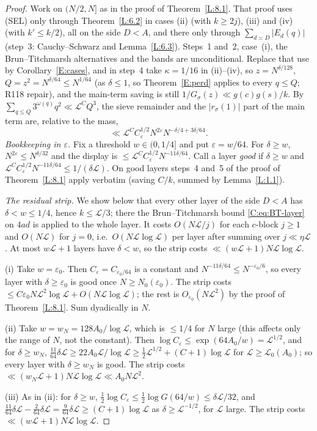 \documentclass[10pt,reqno]{amsart}
\theoremstyle{definition}
\numberwithin{equation}{section}
\newcommand{\cL}{\mathcal L}
\begin{document}
\begin{proof}
Work on $(N/2,N]$ as in the proof of Theorem~\ref{L:8.1}. That proof
uses (SEL) only through Theorem~\ref{L:6.2} in cases (ii) (with $k\ge2j$),
(iii) and (iv) (with $k'\le k/2$), all on the side $D<A$, and there only
through $\sum_{d\asymp D}|E_d(q)|$ (step~3: Cauchy--Schwarz and
Lemma~\ref{L:6.3}). Steps~1 and~2, case~(i), the Brun--Titchmarsh
alternatives and the bands are unconditional. Replace that use by
Corollary~\ref{E:cases}, and in step~4 take $\kappa=1/16$ in (ii)--(iv), so
$z=N^{\delta/128}$, $Q=z^2=N^{\delta/64}\le N^{1/64}$ (as $\delta\le1$, so Theorem~\ref{E:perd} applies to every $q\le Q$; R118 repair), and the main-term saving is still
$1/G_\sigma(z)\ll g(c)g(s)/k$. By
$\sum_{q\le Q}3^{\omega(q)}q^2\ll\cL^CQ^3$, the sieve remainder and the
$|r_\sigma(1)|$ part of the main term are, relative to the mass,
\[
 \ll\cL^CC_\varepsilon^{1/2}N^{2\varepsilon}N^{-\delta/4+3\delta/64}.
\]
\emph{Bookkeeping in $\varepsilon$.} Fix a threshold $w\in(0,1/4]$ and put
$\varepsilon=w/64$. For $\delta\ge w$, $N^{2\varepsilon}\le N^{\delta/32}$ and the
display is $\le\cL^CC_\varepsilon^{1/2}N^{-11\delta/64}$. Call a layer
\emph{good} if $\delta\ge w$ and $\cL^CC_\varepsilon^{1/2}N^{-11\delta/64}\le1/(\delta\cL)$.
On good layers steps~4 and~5 of the proof of Theorem~\ref{L:8.1} apply
verbatim (saving $C/k$, summed by Lemma~\ref{L:1.1}).

\emph{The residual strip.} We show below that every other layer of the side
$D<A$ has $\delta<w\le1/4$, hence $k\le\cL/3$; there the
Brun--Titchmarsh bound \eqref{C:eq:BT-layer} on $4ad$ is applied to the whole
layer. It costs $O(N\cL/j)$ for each $c$-block $j\ge1$ and $O(N\cL)$ for
$j=0$, i.e.\ $O(N\cL\log\cL)$ per layer after summing over $j\ll\eta\cL$.
At most $w\cL+1$ layers have $\delta<w$, so the strip costs
$\ll(w\cL+1)N\cL\log\cL$.

(i) Take $w=\varepsilon_0$. Then $C_\varepsilon=C_{\varepsilon_0/64}$ is a constant
and $N^{-11\delta/64}\le N^{-\varepsilon_0/6}$, so every layer with
$\delta\ge\varepsilon_0$ is good once $N\ge N_0(\varepsilon_0)$. The strip costs
$\le C\varepsilon_0N\cL^2\log\cL+O(N\cL\log\cL)$; the rest is
$O_{\varepsilon_0}(N\cL^2)$ by the proof of Theorem~\ref{L:8.1}. Sum dyadically
in $N$.

(ii) Take $w=w_N=128A_0/\log\cL$, which is $\le1/4$ for $N$ large (this
affects only the range of $N$, not the constant). Then
$\log C_\varepsilon\le\exp(64A_0/w)=\cL^{1/2}$, and for $\delta\ge w_N$,
$\tfrac{11}{64}\delta\cL\ge22A_0\cL/\log\cL\ge\tfrac12\cL^{1/2}+(C+1)\log\cL$ for
$\cL\ge\cL_0(A_0)$; so every layer with $\delta\ge w_N$ is good. The strip costs
$\ll(w_N\cL+1)N\cL\log\cL\ll A_0N\cL^2$.

(iii) As in (ii): for $\delta\ge w$,
$\tfrac12\log C_\varepsilon\le\tfrac12\log G(64/w)\le\delta\cL/32$, and
$\tfrac{11}{64}\delta\cL-\tfrac2{64}\delta\cL=\tfrac9{64}\delta\cL\ge(C+1)\log\cL$
as $\delta\ge\cL^{-1/2}$, for $\cL$ large. The strip costs
$\ll(w\cL+1)N\cL\log\cL$.
\end{proof}
\end{document}
